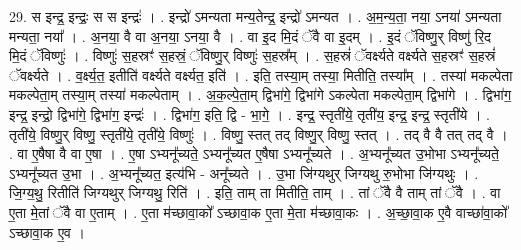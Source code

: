 \documentclass[17pt]{extarticle}
\begin{document}
29. स इन्द्र॒ इन्द्रः॒ स स इन्द्रः॑ । . इन्द्रो॑ ऽमन्यता मन्य॒तेन्द्र॒ इन्द्रो॑ ऽमन्यत । . अ॒म॒न्य॒ता॒ नया॒ ऽनया॑ ऽमन्यता मन्यता॒ नया᳚ । . अ॒नया॒ वै वा अ॒नया॒ ऽनया॒ वै । . वा इ॒द मि॒दं ॅवै वा इ॒दम् । . इ॒दं ॅविष्णु॒र् विष्णु॑ रि॒द मि॒दं ॅविष्णुः॑ । . विष्णुः॑ स॒हस्रꣳ॑ स॒हस्रं॒ ॅविष्णु॒र् विष्णुः॑ स॒हस्र᳚म् । . स॒हस्रं॑ ॅवर्क्ष्यते वर्क्ष्यते स॒हस्रꣳ॑ स॒हस्रं॑ ॅवर्क्ष्यते । . व॒र्क्ष्य॒त॒ इतीति॑ वर्क्ष्यते वर्क्ष्यत॒ इति॑ । . इति॒ तस्या॒म् तस्या॒ मितीति॒ तस्या᳚म् । . तस्या॑ मकल्पेता मकल्पेता॒म् तस्या॒म् तस्या॑ मकल्पेताम् । . अ॒क॒ल्पे॒ता॒म् द्विभा॑गे॒ द्विभा॑गे ऽकल्पेता मकल्पेता॒म् द्विभा॑गे । . द्विभा॑ग॒ इन्द्र॒ इन्द्रो॒ द्विभा॑गे॒ द्विभा॑ग॒ इन्द्रः॑ । . द्विभा॑ग॒ इति॒ द्वि - भा॒गे॒ । . इन्द्र॒ स्तृती॑ये॒ तृती॑य॒ इन्द्र॒ इन्द्र॒ स्तृती॑ये । . तृती॑ये॒ विष्णु॒र् विष्णु॒ स्तृती॑ये॒ तृती॑ये॒ विष्णुः॑ । . विष्णु॒ स्तत् तद् विष्णु॒र् विष्णु॒ स्तत् । . तद् वै वै तत् तद् वै । . वा ए॒षैषा वै वा ए॒षा । . ए॒षा ऽभ्यनू᳚च्यते॒ ऽभ्यनू᳚च्यत ए॒षैषा ऽभ्यनू᳚च्यते । . अ॒भ्यनू᳚च्यत उ॒भोभा ऽभ्यनू᳚च्यते॒ ऽभ्यनू᳚च्यत उ॒भा । . अ॒भ्यनू᳚च्यत॒ इत्य॑भि - अनू᳚च्यते । . उ॒भा जि॑ग्यथुर् जिग्यथु रु॒भोभा जि॑ग्यथुः । . जि॒ग्य॒थु॒ रितीति॑ जिग्यथुर् जिग्यथु॒ रिति॑ । . इति॒ ताम् ता मितीति॒ ताम् । . तां ॅवै वै ताम् तां ॅवै । . वा ए॒ता मे॒तां ॅवै वा ए॒ताम् । . ए॒ता म॑च्छावा॒को᳚ ऽच्छावा॒क ए॒ता मे॒ता म॑च्छावा॒कः । . अ॒च्छा॒वा॒क ए॒वै वाच्छा॑वा॒को᳚ ऽच्छावा॒क ए॒व । \newline
\end{document}
